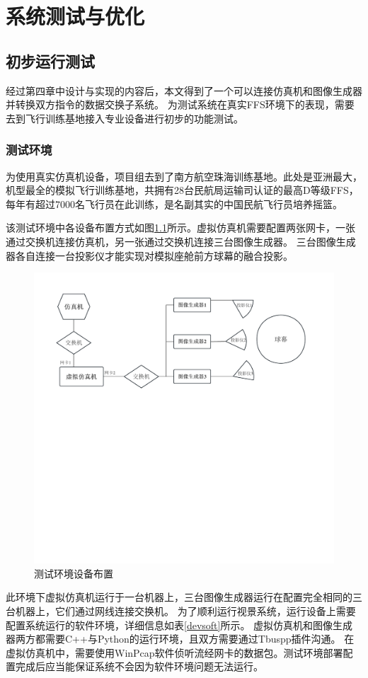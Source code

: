 \chapter{系统测试与优化}
\section{初步运行测试}
经过第四章中设计与实现的内容后，本文得到了一个可以连接仿真机和图像生成器并转换双方指令的数据交换子系统。
为测试系统在真实FFS环境下的表现，需要去到飞行训练基地接入专业设备进行初步的功能测试。
\subsection{测试环境}
为使用真实仿真机设备，项目组去到了南方航空珠海训练基地。此处是亚洲最大，机型最全的模拟飞行训练基地，共拥有28台民航局运输司认证的最高D等级FFS，每年有超过7000名飞行员在此训练，是名副其实的中国民航飞行员培养摇篮。
\par
该测试环境中各设备布置方式如图\ref{testenv}所示。虚拟仿真机需要配置两张网卡，一张通过交换机连接仿真机，另一张通过交换机连接三台图像生成器。
三台图像生成器各自连接一台投影仪才能实现对模拟座舱前方球幕的融合投影。
\begin{figure}[h!]
    \begin{center}
        \includegraphics[width=\textwidth]{pictures/testenv.pdf}
        \caption{测试环境设备布置}
        \label{testenv}
    \end{center}
\end{figure}
\par
此环境下虚拟仿真机运行于一台机器上，三台图像生成器运行在配置完全相同的三台机器上，它们通过网线连接交换机。
为了顺利运行视景系统，运行设备上需要配置系统运行的软件环境，详细信息如表\ref{devsoft}所示。
虚拟仿真机和图像生成器两方都需要C++与Python的运行环境，且双方需要通过Tbuspp插件沟通。
在虚拟仿真机中，需要使用WinPcap软件侦听流经网卡的数据包。测试环境部署配置完成后应当能保证系统不会因为软件环境问题无法运行。


